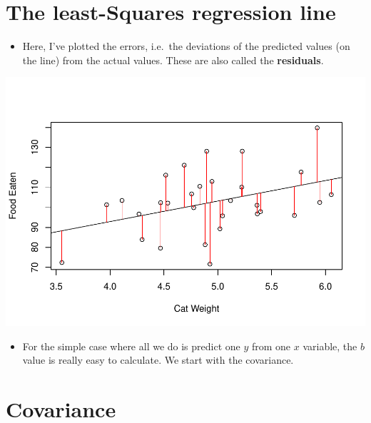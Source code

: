 \documentclass[]{article}
\providecommand{\tightlist}{%
  \setlength{\itemsep}{0pt}\setlength{\parskip}{0pt}}
\begin{document}
\section{The least-Squares regression
line}\label{the-least-squares-regression-line}

\begin{itemize}
\tightlist
\item
  Here, I've plotted the errors, i.e.~the deviations of the predicted
  values (on the line) from the actual values. These are also called the
  \textbf{residuals}.
\end{itemize}

\includegraphics{Basics_of_Regression_files/figure-latex/unnamed-chunk-5-1.pdf}

\begin{itemize}
\tightlist
\item
  For the simple case where all we do is predict one \(y\) from one
  \(x\) variable, the \(b\) value is really easy to calculate. We start
  with the covariance.
\end{itemize}

\section{Covariance}\label{covariance}
\end{document}
